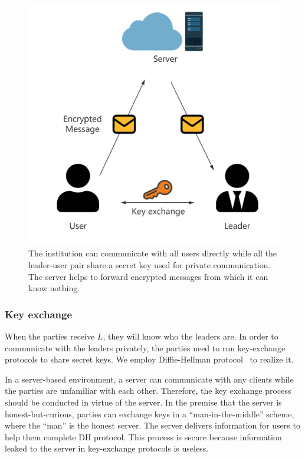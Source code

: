 \begin{figure}[!ht]
    \centering
    \includegraphics[width=\columnwidth]{img/leader-user.png}
    \caption{The institution can communicate with all users directly while all the leader-user pair share a secret key used for private communication. The server helps to forward encrypted messages from which it can know nothing.}
    \label{leader-user}
\end{figure}

\subsubsection{\textbf{Key exchange}}
When the parties receive $L$, they will know who the leaders are. In order to communicate with the leaders privately, the parties need to run key-exchange protocols to share secret keys. We employ Diffie-Hellman protocol~\cite{DH} to realize it. 

In a server-based environment, a server can communicate with any clients while the parties are unfamiliar with each other. Therefore, the key exchange process should be conducted in virtue of the server. In the premise that the server is honest-but-curious, parties can exchange keys in a ``man-in-the-middle'' scheme, where the ``man'' is the honest server. The server delivers information for users to help them complete DH protocol. This process is secure because information leaked to the server in key-exchange protocols is useless.

